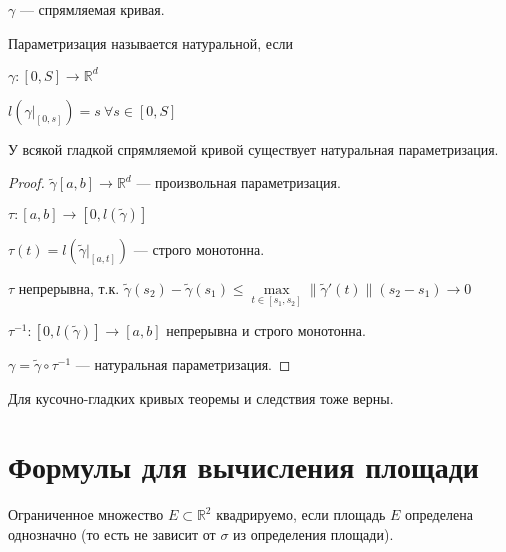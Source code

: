     \begin{Def}

        $\gamma$ --- спрямляемая кривая.

        Параметризация называется натуральной, если 
    
        $\gamma \colon [0, S] \rightarrow \mathbb{R}^d$

        $l(\gamma|_{[0, s]}) = s \: \forall s \in [0, S]$

    \end{Def}

    \begin{theorem}

        У всякой гладкой спрямляемой кривой существует натуральная параметризация.

    \end{theorem}

    \begin{proof}

        $\widetilde{\gamma}[a, b] \rightarrow \mathbb{R}^d$ --- произвольная параметризация.

        $\tau \colon [a, b] \rightarrow [0, l(\widetilde{\gamma})]$

        $\tau(t) = l(\widetilde{\gamma}|_{[a, t]})$ --- строго монотонна.

        $\tau$ непрерывна, т.к. $\widetilde{\gamma}(s_2) - \widetilde{\gamma}(s_1) \le \max\limits_{t \in [s_1,s_2]}\|\widetilde{\gamma}'(t)\|(s_2 - s_1) \rightarrow 0$

        $\tau^{-1} \colon [0, l(\widetilde{\gamma})] \rightarrow [a, b]$ непрерывна и строго монотонна.

        $\gamma = \widetilde{\gamma} \circ \tau^{-1}$ --- натуральная параметризация.

    \end{proof}

    \begin{Rem}

        Для кусочно-гладких кривых теоремы и следствия тоже верны.

    \end{Rem}

\section {Формулы для вычисления площади}

    \begin{Def}

        Ограниченное множество $E \subset \mathbb{R}^2$ квадрируемо, если площадь $E$ определена однозначно (то есть не зависит от $\sigma$ из определения площади).

    \end{Def}

